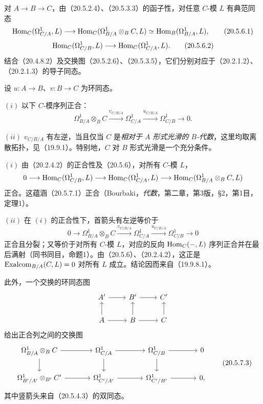 对 $A\to B\to C$，由（20.5.2.4）、（20.5.3.3）的函子性，对任意 $C$-模 $L$ 有典范同态
\begin{equation}
 \operatorname{Hom}_C(\Omega^1_{C/A},L)
 \longrightarrow\operatorname{Hom}_C(\Omega^1_{B/A}\otimes_B C,L)
 \simeq\operatorname{Hom}_B(\Omega^1_{B/A},L),
 \tag{20.5.6.1}
\end{equation}
\begin{equation}
 \operatorname{Hom}_C(\Omega^1_{C/B},L)\longrightarrow\operatorname{Hom}_C(\Omega^1_{C/A},L).
 \tag{20.5.6.2}
\end{equation}
结合（20.4.8.2）及交换图（20.5.2.6）、（20.5.3.5），它们分别对应于（20.2.1.2）、（20.2.1.3）的导子同态。

设 $u:A\to B$、$v:B\to C$ 为环同态。

$(i)$ 以下 $C$-模序列正合：
\begin{equation}
 \Omega^1_{B/A}\otimes_B C\xrightarrow{v_{C/B/A}}
 \Omega^1_{C/A}\xrightarrow{u_{C/B/A}}\Omega^1_{C/B}\longrightarrow0.
 \tag{20.5.7.1}
\end{equation}

$(ii)$ $v_{C/B/A}$ 有左逆，当且仅当 $C$ 是\emph{相对于 $A$ 形式光滑的 $B$-代数}，这里均取离散拓扑，见（19.9.1）。特别地，$C$ 对 $B$ 形式光滑是一个充分条件。

$(i)$ 由（20.2.4.2）的正合性及（20.5.6），对所有 $C$-模 $L$，
\[
0\longrightarrow\operatorname{Hom}_C(\Omega^1_{C/B},L)
\longrightarrow\operatorname{Hom}_C(\Omega^1_{C/A},L)
\longrightarrow\operatorname{Hom}_C(\Omega^1_{B/A}\otimes_B C,L)
\]
正合。这蕴涵（20.5.7.1）正合（Bourbaki，\textit{代数}，第二章，第3版，§2，第1目，定理1）。

$(ii)$ 在 $(i)$ 的正合性下，首箭头有左逆等价于
\begin{equation}
0\longrightarrow\Omega^1_{B/A}\otimes_B C
 \xrightarrow{v_{C/B/A}}\Omega^1_{C/A}
 \xrightarrow{u_{C/B/A}}\Omega^1_{C/B}\longrightarrow0
\tag{20.5.7.2}
\end{equation}
正合且分裂；又等价于对所有 $C$-模 $L$，对应的反向 $\operatorname{Hom}_C(-,L)$ 序列正合并在最后满射（同书同目，命题1）。由（20.5.6）、（20.2.4.2），这正是
$\operatorname{Exalcom}_{B/A}(C,L)=0$ 对所有 $L$ 成立。结论因而来自（19.9.8.1）。

此外，一个交换的环同态图
\[
\begin{tikzcd}
 A'\arrow[r]&B'\arrow[r]&C'\\
 A\arrow[u]\arrow[r]&B\arrow[u]\arrow[r]&C\arrow[u]
\end{tikzcd}
\]
给出正合列之间的交换图
\begin{equation}
\begin{tikzcd}[column sep=large]
 \Omega^1_{B/A}\otimes_B C\arrow[r]\arrow[d]&\Omega^1_{C/A}\arrow[r]\arrow[d]&\Omega^1_{C/B}\arrow[r]\arrow[d]&0\\
 \Omega^1_{B'/A'}\otimes_{B'} C'\arrow[r]&\Omega^1_{C'/A'}\arrow[r]&\Omega^1_{C'/B'}\arrow[r]&0,
\end{tikzcd}
\tag{20.5.7.3}
\end{equation}
其中竖箭头来自（20.5.4.3）的双同态。

